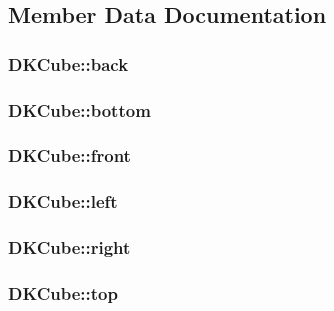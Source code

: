 \subsection{Member Data Documentation}
\hypertarget{class_d_k_cube_aec88e3706d5f04a03efe97d7cc924318}{
\subsubsection[{back}]{ D\-K\-Cube\-::back}}\label{class_d_k_cube_aec88e3706d5f04a03efe97d7cc924318}
\hypertarget{class_d_k_cube_ae0f631844230348b3f41b0a774f1a90d}{
\subsubsection[{bottom}]{ D\-K\-Cube\-::bottom}}\label{class_d_k_cube_ae0f631844230348b3f41b0a774f1a90d}
\hypertarget{class_d_k_cube_a6a7f3582d4ebf7ca50dabda3832126ab}{
\subsubsection[{front}]{ D\-K\-Cube\-::front}}\label{class_d_k_cube_a6a7f3582d4ebf7ca50dabda3832126ab}
\hypertarget{class_d_k_cube_abfd90cda0006120712a7a118afb8c328}{
\subsubsection[{left}]{ D\-K\-Cube\-::left}}\label{class_d_k_cube_abfd90cda0006120712a7a118afb8c328}
\hypertarget{class_d_k_cube_a7d12e2340c7378dc22ee1b3ac440aed5}{
\subsubsection[{right}]{ D\-K\-Cube\-::right}}\label{class_d_k_cube_a7d12e2340c7378dc22ee1b3ac440aed5}
\hypertarget{class_d_k_cube_aa3a9b9315bf08c4dfff0e19d191d731d}{
\subsubsection[{top}]{ D\-K\-Cube\-::top}}\label{class_d_k_cube_aa3a9b9315bf08c4dfff0e19d191d731d}


